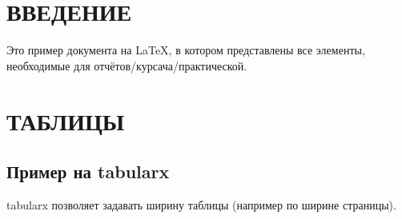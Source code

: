 \documentclass[14pt, a4paper]{extarticle}
\begin{document}
\makeatletter
\renewcommand{\l@section}{\@dottedtocline{1}{0em}{1.25em}}
\renewcommand{\l@subsection}{\@dottedtocline{2}{0em}{1.75em}}
\renewcommand{\l@subsubsection}{\@dottedtocline{3}{0em}{2.6em}}
\renewcommand{\@dotsep}{1.25}
\makeatother

\def\contentsname{СОДЕРЖАНИЕ}

\begin{titlepage}

\end{titlepage}
\tableofcontents

\section*{ВВЕДЕНИЕ}
\setcounter{page}{3}

Это пример документа на \LaTeX, в котором представлены все элементы, необходимые для отчётов/курсача/практической.

\section{ТАБЛИЦЫ}

\subsection{Пример на tabularx}
tabularx позволяет задавать ширину таблицы (например по ширине страницы).\cite{overleaf-tables}
\end{document}
